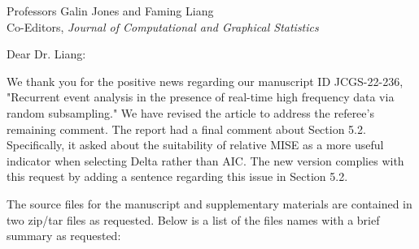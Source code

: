 \documentclass[11pt]{letter} %
\begin{document}

\begin{letter}{Professors Galin Jones and Faming Liang \\
    Co-Editors, {\em Journal of Computational and Graphical Statistics}
         }


\signature{Walter Dempsey\\
University of Michigan \\
Department of Biostatistics\\
M4057 SPH II \\
1415 Washington Heights \\
wdem@umich.edu} %


\date\today

\opening{Dear Dr. Liang:}

We thank you for the positive news regarding our manuscript ID JCGS-22-236, "Recurrent event analysis in the presence of real-time high frequency data via random subsampling."   We have revised the article to address the referee's remaining comment.  The report had a final comment about Section 5.2. Specifically, it asked about the suitability of relative MISE as a more useful indicator when selecting Delta rather than AIC. The new version complies with this request by adding a sentence regarding this issue in Section 5.2.

The source files for the manuscript and supplementary materials are contained in two zip/tar files as requested.  Below is a list of the files names with a brief summary as requested:\\


\end{letter}
\end{document}
